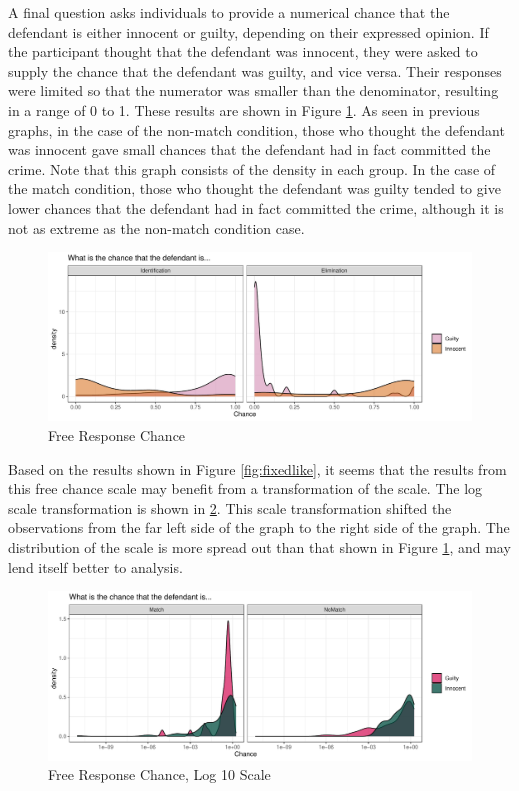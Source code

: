 \documentclass[print]{nuthesis}
\begin{document}
A final question asks individuals to provide a numerical chance that the defendant is either innocent or guilty, depending on their expressed opinion.
If the participant thought that the defendant was innocent, they were asked to supply the chance that the defendant was guilty, and vice versa.
Their responses were limited so that the numerator was smaller than the denominator, resulting in a range of 0 to 1.
These results are shown in Figure \ref{fig:freelike}.
As seen in previous graphs, in the case of the non-match condition, those who thought the defendant was innocent gave small chances that the defendant had in fact committed the crime.
Note that this graph consists of the density in each group.
In the case of the match condition, those who thought the defendant was guilty tended to give lower chances that the defendant had in fact committed the crime, although it is not as extreme as the non-match condition case.

\begin{figure}

{\centering \includegraphics[width=\linewidth]{thesis_files/figure-latex/freelike-1} 

}

\caption{Free Response Chance}\label{fig:freelike}
\end{figure}

Based on the results shown in Figure \ref{fig:fixedlike}, it seems that the results from this free chance scale may benefit from a transformation of the scale.
The log scale transformation is shown in \ref{fig:freelike10}.
This scale transformation shifted the observations from the far left side of the graph to the right side of the graph.
The distribution of the scale is more spread out than that shown in Figure \ref{fig:freelike}, and may lend itself better to analysis.

\begin{figure}

{\centering \includegraphics[width=\linewidth]{thesis_files/figure-latex/freelike10-1} 

}

\caption{Free Response Chance, Log 10 Scale}\label{fig:freelike10}
\end{figure}
\end{document}
